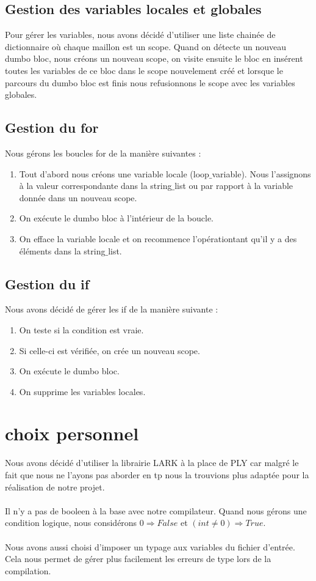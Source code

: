 \documentclass[a4paper, 12pt]{article}
\begin{document}
\subsection{Gestion des variables locales et globales}
Pour gérer les variables, nous avons décidé d'utiliser une liste chainée de dictionnaire où chaque maillon est un scope. Quand on détecte un nouveau dumbo bloc, nous créons un nouveau scope, on visite ensuite le bloc en insérent toutes les variables de ce bloc dans le scope nouvelement créé et lorsque le parcours du dumbo bloc est finis nous refusionnons le scope avec les variables globales.

\subsection{Gestion du for}

Nous gérons les boucles for de la manière suivantes :\begin{enumerate}
\item Tout d'abord nous créons une variable locale (loop$\_$variable). Nous l'assignons à la valeur correspondante dans la string$\_$list ou par rapport à la variable donnée dans un nouveau scope.
\item On exécute le dumbo bloc à l'intérieur de la boucle.
\item On efface la variable locale et on recommence l'opérationtant qu'il y a des éléments dans la string$\_$list.
\end{enumerate}
\subsection{Gestion du if}
Nous avons décidé de gérer les if de la manière suivante : \begin{enumerate}
\item On teste si la condition est vraie.
\item Si celle-ci est vérifiée, on crée un nouveau scope.
\item On exécute le dumbo bloc.
\item On supprime les variables locales.
\end{enumerate}

\section{choix personnel}

Nous avons décidé d'utiliser la librairie LARK à la place de PLY car malgré le fait que nous ne l'ayons pas aborder en tp nous la trouvions plus adaptée pour la réalisation de notre projet.\\
\\
Il n'y a pas de booleen à la base avec notre compilateur. Quand nous gérons une condition logique, nous considérons $ 0 \Rightarrow False$ et $ (int \neq 0) \Rightarrow True$.\\
\\
Nous avons aussi choisi d'imposer un typage aux variables du fichier d'entrée. Cela nous permet de gérer plus facilement les erreurs de type lors de la compilation.
\end{document}
